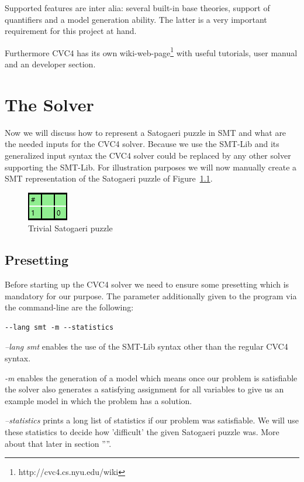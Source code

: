 Supported features are inter alia: several built-in base theories, support of quantifiers and a model generation ability. The latter is a very important requirement for this project at hand.

Furthermore CVC4 has its own wiki-web-page\footnote{http://cvc4.cs.nyu.edu/wiki} with useful tutorials, user manual and an developer section.

\chapter{The Solver} \label{The Solver}
Now we will discuss how to represent a Satogaeri puzzle in SMT and what are the needed inputs for the CVC4 solver. Because we use the SMT-Lib and its generalized input syntax the CVC4 solver could be replaced by any other solver supporting the SMT-Lib. For illustration purposes we will now manually create a SMT representation of the Satogaeri puzzle of Figure~\ref{fig:solver_example}.
\begin{figure}
  \centering
  \includegraphics[scale=1]{Pictures/Solver_example.png} 
  \caption{Trivial Satogaeri puzzle}
  \label{fig:solver_example}
\end{figure}

\section{Presetting}
Before starting up the CVC4 solver we need to ensure some presetting which is mandatory for our purpose.
The parameter additionally given to the program via the command-line are the following:
\begin{lstlisting}
--lang smt -m --statistics
\end{lstlisting}

\emph{--lang smt} enables the use of the SMT-Lib syntax other than the regular CVC4 syntax.

\emph{-m} enables the generation of a model which means once our problem is satisfiable the solver also generates a satisfying assignment for all variables to give us an example model in which the problem has a solution.

\emph{--statistics} prints a long list of statistics if our problem was satisfiable. We will use these statistics to decide how 'difficult' the given Satogaeri puzzle was. More about that later in section ''''. 


